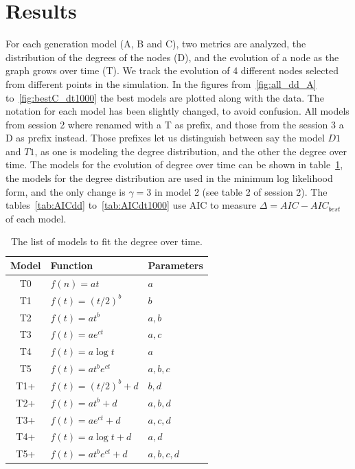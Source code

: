 \documentclass[a4paper]{article}
\begin{document}
\section{Results}
%
For each generation model (A, B and C), two metrics are analyzed, the 
distribution of the degrees of the nodes (D), and the evolution of a node as the 
graph grows over time (T).  We track the evolution of 4 different nodes selected 
from different points in the simulation. In the figures from~\ref{fig:all_dd_A} 
to~\ref{fig:bestC_dt1000} the best models are plotted along with the data. The 
notation for each model has been slightly changed, to avoid confusion. All 
models from session 2 where renamed with a T as prefix, and those from the 
session 3 a D as prefix instead. Those prefixes let us distinguish between say 
the model $D1$ and $T1$, as one is modeling the degree distribution, and the 
other the degree over time. The models for the evolution of degree over time can 
be shown in table~\ref{tab:Tmodels}, the models for the degree distribution are 
used in the minimum log likelihood form, and the only change is $\gamma = 3 $ in 
model 2 (see table 2 of session 2).
%
The tables~\ref{tab:AICdd} to~\ref{tab:AICdt1000} use AIC to
measure $\Delta = AIC - AIC_{best}$ of each model.
%
\begin{table}[H]
	\centering
	\begin{tabular}{cll}
		\toprule
		Model & Function & Parameters\\
		\midrule
		T0  & $f(n) = at$								& $a$ \\
		T1  & $f(t) = (t/2)^b$					& $b$ \\
		T2  & $f(t) = at^b$ 						& $a,b$\\
		T3  & $f(t) = ae^{ct}$					& $a,c$\\
		T4  & $f(t) = a\log t$					& $a$\\
		T5  & $f(t) = at^be^{ct}$				& $a,b,c$\\
		T1+ & $f(t) = (t/2)^b + d$			& $b,d$\\
		T2+ & $f(t) = at^b + d$					& $a,b,d$\\
		T3+ & $f(t) = ae^{ct} + d$			& $a,c,d$\\
		T4+ & $f(t) = a\log t + d$			& $a,d$\\
		T5+ & $f(t) = at^be^{ct} + d$	& $a,b,c,d$\\
		\bottomrule
	\end{tabular}
	\caption{The list of models to fit the degree over time.}
	\label{tab:Tmodels}
\end{table}
\end{document}
